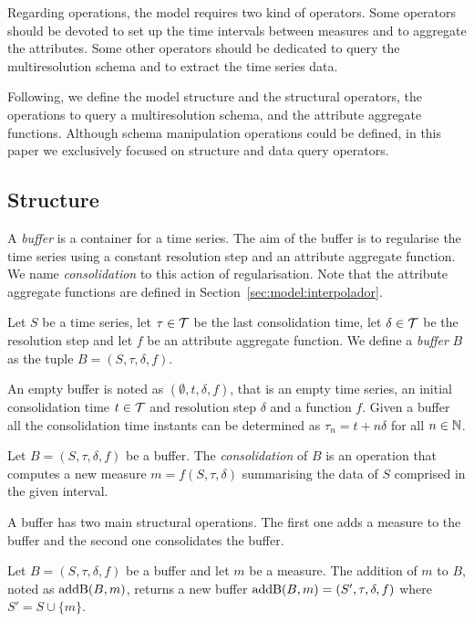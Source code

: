 Regarding operations, the  model requires two kind of
operators. Some operators should be devoted to set up the time
intervals between measures and to aggregate the attributes. Some other
operators should be dedicated to query the multiresolution schema and
to extract the time series data.

Following, we define the  model structure and the
structural operators, the operations to query a multiresolution
schema, and the attribute aggregate functions.  Although schema
manipulation operations could be defined, in this paper we exclusively
focused on structure and data query operators.


\subsection{Structure}

A \emph{buffer} is a container for a time series. The aim of the
buffer is to regularise the time series using a constant resolution step
and an attribute aggregate function.  We name \emph{consolidation} to
this action of regularisation.  Note that the attribute aggregate
functions are defined in Section~\ref{sec:model:interpolador}.

\begin{definition}[Buffer]
  Let $S$ be a time series, let $\tau\in\cal{T}$ be the last
  consolidation time, let $\delta\in\cal{T}$ be the resolution step
  and let $f$ be an attribute aggregate function. We define a
  \emph{buffer} $B$ as the tuple $B=(S,\tau,\delta,f)$.
\end{definition}

An empty buffer is noted as $(\emptyset, t, \delta, f)$, that is an
empty time series, an initial consolidation time $t\in\cal{T}$ and
resolution step $\delta$ and a function $f$.  Given a buffer all the
consolidation time instants can be determined as $\tau_n=t+n\delta$
for all $n\in\mathbb{N}$.

Let $B=(S, \tau, \delta, f)$ be a buffer. The \emph{consolidation} of
$B$ is an operation that computes a new measure $m=f(S, \tau, \delta)$
summarising the data of $S$ comprised in the given interval.

A buffer has two main structural operations. The first one adds a
measure to the buffer and the second one consolidates the buffer.

Let $B=(S,\tau,\delta,f)$ be a buffer and let $m$ be a measure.  The
addition of $m$ to $B$, noted as $\operatorname{addB}(B,m)$, returns a new buffer
$\operatorname{addB}(B,m)=(S',\tau,\delta,f)$ where $S' = S \cup \{m\}$.

